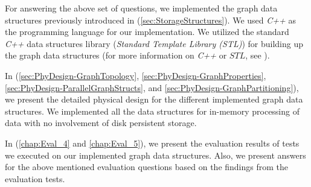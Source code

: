 {\begin{enumerate}
\end{enumerate}

For answering the above set of questions, we implemented the graph data structures previously introduced in (\ref{sec:StorageStructures}). We used \textit{C++} as the programming language for our implementation. We utilized the standard \textit{C++} data structures library (\textit{Standard Template Library (STL)}) for building up the graph data structures (for more information on \textit{C++} or $STL$, see \cite{josuttis2012c++}). 

In (\ref{sec:PhyDesign-GraphTopology}, \ref{sec:PhyDesign-GraphProperties}, \ref{sec:PhyDesign-ParallelGraphStructs}, and \ref{sec:PhyDesign-GraphPartitioning}), we present the detailed physical design for the different implemented graph data structures. We implemented all the data structures for in-memory processing of data with no involvement of disk persistent storage. 

In (\ref{chap:Eval_4} and \ref{chap:Eval_5}), we present the evaluation results of tests we executed on our implemented graph data structures. Also, we present answers for the above mentioned evaluation questions based on the findings from the evaluation tests.


}
